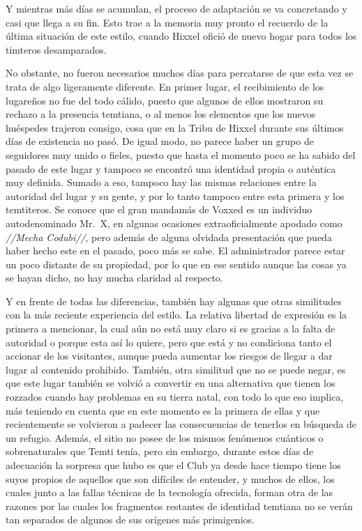 \documentclass[
  spanish,
]{book}
\begin{document}
Y mientras más días se acumulan, el proceso de adaptación se va concretando y casi que llega a su fin. Esto trae a la memoria muy pronto el recuerdo de la última situación de este estilo, cuando Hixxel ofició de nuevo hogar para todos los timteros desamparados.

No obstante, no fueron necesarios muchos días para percatarse de que esta vez se trata de algo ligeramente diferente. En primer lugar, el recibimiento de los lugareños no fue del todo cálido, puesto que algunos de ellos mostraron su rechazo a la presencia temtiana, o al menos los elementos que los nuevos huéspedes trajeron consigo, cosa que en la Tribu de Hixxel durante sus últimos días de existencia no pasó. De igual modo, no parece haber un grupo de seguidores muy unido o fieles, puesto que hasta el momento poco se ha sabido del pasado de este lugar y tampoco se encontró una identidad propia o auténtica muy definida. Sumado a eso, tampoco hay las mismas relaciones entre la autoridad del lugar y su gente, y por lo tanto tampoco entre esta primera y los temtiteros. Se conoce que el gran mandamás de Voxxed es un individuo autodenominado Mr.~X, en algunas ocasiones extraoficialmente apodado como \emph{//Mecha Codubi//}, pero además de alguna olvidada presentación que pueda haber hecho este en el pasado, poco más se sabe. El administrador parece estar un poco distante de su propiedad, por lo que en ese sentido aunque las cosas ya se hayan dicho, no hay mucha claridad al respecto.

Y en frente de todas las diferencias, también hay algunas que otras similitudes con la más reciente experiencia del estilo. La relativa libertad de expresión es la primera a mencionar, la cual aún no está muy claro si es gracias a la falta de autoridad o porque esta así lo quiere, pero que está y no condiciona tanto el accionar de los visitantes, aunque pueda aumentar los riesgos de llegar a dar lugar al contenido prohibido. También, otra similitud que no se puede negar, es que este lugar también se volvió a convertir en una alternativa que tienen los rozzados cuando hay problemas en su tierra natal, con todo lo que eso implica, más teniendo en cuenta que en este momento es la primera de ellas y que recientemente se volvieron a padecer las consecuencias de tenerlos en búsqueda de un refugio. Además, el sitio no posee de los mismos fenómenos cuánticos o sobrenaturales que Temti tenía, pero sin embargo, durante estos días de adecuación la sorpresa que hubo es que el Club ya desde hace tiempo tiene los suyos propios de aquellos que son difíciles de entender, y muchos de ellos, los cuales junto a las fallas técnicas de la tecnología ofrecida, forman otra de las razones por las cuales los fragmentos restantes de identidad temtiana no se verán tan separados de algunos de sus orígenes más primigenios.
\end{document}
